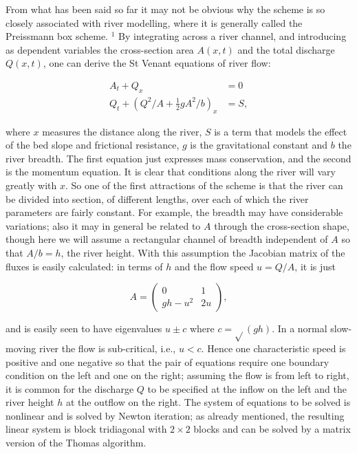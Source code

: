 \documentclass[10pt]{article}
\begin{document}
From what has been said so far it may not be obvious why the scheme is so closely associated with river modelling, where it is generally called the Preissmann box scheme. \({ }^{1}\) By integrating across a river channel, and introducing as dependent variables the cross-section area \(A(x, t)\) and the total discharge \(Q(x, t)\), one can derive the St Venant equations of river flow:

\[
\begin{aligned}
A_{t}+Q_{x} & =0 \\
Q_{t}+\left(Q^{2} / A+\frac{1}{2} g A^{2} / b\right)_{x} & =S,
\end{aligned}
\]

where \(x\) measures the distance along the river, \(S\) is a term that models the effect of the bed slope and frictional resistance, \(g\) is the gravitational constant and \(b\) the river breadth. The first equation just expresses mass conservation, and the second is the momentum equation. It is clear that conditions along the river will vary greatly with \(x\). So one of the first attractions of the scheme is that the river can be divided into section, of different lengths, over each of which the river parameters are fairly constant. For example, the breadth may have considerable variations; also it may in general be related to \(A\) through the cross-section shape, though here we will assume a rectangular channel of breadth independent of \(A\) so that \(A / b=h\), the river height. With this assumption the Jacobian matrix of the fluxes is easily calculated: in terms of \(h\) and the flow speed \(u=Q / A\), it is just

\[
A=\left(\begin{array}{cc}
0 & 1 \\
g h-u^{2} & 2 u
\end{array}\right),
\]

and is easily seen to have eigenvalues \(u \pm c\) where \(c=\sqrt{ }(g h)\). In a normal slow-moving river the flow is sub-critical, i.e., \(u<c\). Hence one characteristic speed is positive and one negative so that the pair of equations require one boundary condition on the left and one on the right; assuming the flow is from left to right, it is common for the discharge \(Q\) to be specified at the inflow on the left and the river height \(h\) at the outflow on the right. The system of equations to be solved is nonlinear and is solved by Newton iteration; as already mentioned, the resulting linear system is block tridiagonal with \(2 \times 2\) blocks and can be solved by a matrix version of the Thomas algorithm.
\end{document}
